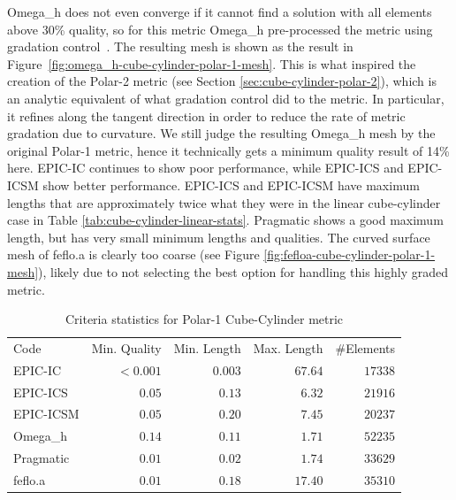 \documentclass[3p,times,procedia,number]{elsarticle}
\begin{document}
Omega\_h does not even converge if it cannot find a solution with
all elements above 30\% quality, so for this metric Omega\_h
pre-processed the metric using gradation control~\cite{Borouchaki-1998-gradation,alauzet-fead-2010-size-gradation-aniso}.
The resulting mesh is shown as the result in Figure~\ref{fig:omega_h-cube-cylinder-polar-1-mesh}.
This is what inspired the creation of the Polar-2 metric
(see Section \ref{sec:cube-cylinder-polar-2}),
which is an analytic equivalent of what gradation control did
to the metric.
In particular, it refines along the tangent direction
in order to reduce the rate of metric gradation due to curvature.
We still judge the resulting Omega\_h mesh by the original Polar-1
metric, hence it technically gets a minimum quality result of 14\% here.
EPIC-IC continues to show poor performance, while EPIC-ICS
and EPIC-ICSM show better performance.
EPIC-ICS and EPIC-ICSM have maximum lengths that are approximately
twice what they were in the linear cube-cylinder case in
Table \ref{tab:cube-cylinder-linear-stats}.
Pragmatic shows a good maximum length,
but has very small minimum lengths and qualities.
The curved surface mesh of feflo.a is clearly too coarse
(see Figure \ref{fig:fefloa-cube-cylinder-polar-1-mesh}),
likely due to not selecting the best option for handling
this highly graded metric.

\begin{table}
\caption{Criteria statistics for Polar-1 Cube-Cylinder metric}
\label{tab:polar-1-stats}
\begin{tabular}{lrrrr}
Code & Min. Quality & Min. Length & Max. Length & \#Elements\\
EPIC-IC    &$<0.001$&      $0.003$&      $67.64$&    $17338$\\
EPIC-ICS   &$  0.05$&      $ 0.13$&      $ 6.32$&    $21916$\\
EPIC-ICSM  &$  0.05$&      $ 0.20$&      $ 7.45$&    $20237$\\
Omega\_h   &$  0.14$&      $ 0.11$&      $ 1.71$&    $52235$\\
Pragmatic  &$  0.01$&      $ 0.02$&      $ 1.74$&    $33629$\\
feflo.a    &$  0.01$&      $ 0.18$&      $17.40$&    $35310$\\
\end{tabular}
\end{table}
\end{document}
